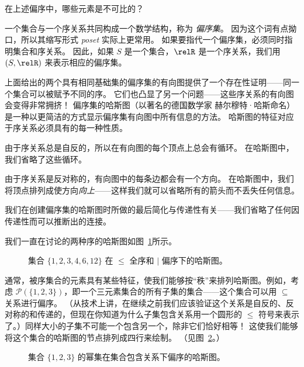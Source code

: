 \begin{exer}
在上述偏序中，哪些元素是不可比的？
\end{exer}

一个集合与一个序关系共同构成一个数学结构，称为 \emph{偏序集}。
因为这个词有点拗口，所以其缩写形式 \emph{poset} 实际上更常用。
如果要指代一个偏序集，必须同时指明集合和序关系。
因此，如果 $S$ 是一个集合，$\relR$ 是一个序关系，我们用 $(S, \relR)$ 来表示相应的偏序集。

上面给出的两个具有相同基础集的偏序集的有向图提供了一个存在性证明——同一个集合可以被赋予不同的序。
它们也凸显了另一个问题——这些序关系的有向图会变得非常拥挤！
偏序集的哈斯图（以著名的德国数学家 赫尔穆特·哈斯命名）是一种以更简洁的方式显示偏序集有向图中所有信息的方法。
哈斯图的特征对应于序关系必须具有的每一种性质。

由于序关系总是自反的，所以在有向图的每个顶点上总会有循环。
在哈斯图中，我们省略了这些循环。

由于序关系是反对称的，有向图中的每条边都会有一个方向。
在哈斯图中，我们将顶点排列成使方向\emph{向上}——这样我们就可以省略所有的箭头而不丢失任何信息。

我们在创建偏序集的哈斯图时所做的最后简化与传递性有关——我们省略了任何因传递性而可以推断出的连接。

我们一直在讨论的两种序的哈斯图如图~\ref{fig:hasse_diag}所示。

\begin{figure}[!hbt]

\caption[一些简单的哈斯图。]{集合 $\{1,2,3,4,6,12\}$ 在 $\leq$ 全序和 $\mid$ 偏序下的哈斯图。}
\label{fig:hasse_diag} 
\end{figure}

通常，被序集合的元素具有某些特征，使我们能够按“秩”来排列哈斯图。例如，考虑 ${\mathcal P}(\{1,2,3\})$，即一个三元素集合的所有子集的集合——这个集合可以用 $\subseteq$ 关系进行偏序。
（从技术上讲，在继续之前我们应该验证这个关系是自反的、反对称的和传递的，但现在你知道为什么子集包含关系用一个圆形的 $\leq$ 符号来表示了。）同样大小的子集不可能一个包含另一个，除非它们恰好相等！
这使我们能够将这个集合的哈斯图的节点排列成四行来绘制。
（见图~\ref{fig:subset_hasse}。）

\begin{figure}[!hbtp]

\caption[$({\mathcal P}(\{1,2,3\}), \subseteq)$ 的哈斯图。]{集合 $\{1,2,3\}$ 的幂集在集合包含关系下偏序的哈斯图。}
\label{fig:subset_hasse} 
\end{figure}

